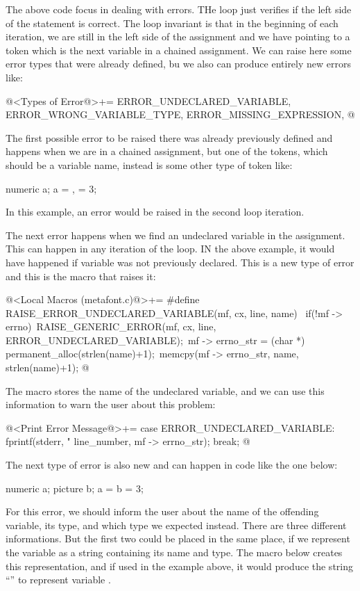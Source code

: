 The above code focus in dealing with errors. THe
loop  just verifies if the left side of the
statement is correct. The loop invariant is that in the beginning of
each iteration, we are still in the left side of the assignment and we
have  pointing to a token which is the next variable
in a chained assignment. We can raise here some error types that were
already defined, bu we also can produce entirely new errors like:

\iniciocodigo
@<Types of Error@>+=
ERROR_UNDECLARED_VARIABLE, ERROR_WRONG_VARIABLE_TYPE, ERROR_MISSING_EXPRESSION,
@
\fimcodigo

The first possible error to be raised there was already previously
defined and happens when we are in a chained assignment, but one of
the tokens, which should be a variable name, instead is some other
type of token like:

\alinhaverbatim
numeric a;
a = , = 3; %
\alinhanormal

In this example, an error would be raised in the second loop iteration.

The next error happens when we find an undeclared variable in the
assignment. This can happen in any iteration of the loop. IN the above
example, it would have happened if variable  was not
previously declared. This is a new type of error and this is the macro
that raises it:

\iniciocodigo
@<Local Macros (metafont.c)@>+=
#define RAISE_ERROR_UNDECLARED_VARIABLE(mf, cx, line, name) {\
  if(!mf -> errno){\
    RAISE_GENERIC_ERROR(mf, cx, line, ERROR_UNDECLARED_VARIABLE);\
    mf -> errno_str = (char *) permanent_alloc(strlen(name)+1);\
    memcpy(mf -> errno_str, name, strlen(name)+1);}}
@
\fimcodigo

The macro stores the name of the undeclared variable, and we can use
this information to warn the user about this problem:

\iniciocodigo
@<Print Error Message@>+=
case ERROR_UNDECLARED_VARIABLE:
  fprintf(stderr, "%
          line_number, mf -> errno_str);
  break;
@
\fimcodigo

The next type of error is also new and can happen in code like the one
below:

\alinhaverbatim
numeric a;
picture b;
a = b = 3; %
\alinhanormal

For this error, we should inform the user about the name of the
offending variable, its type, and which type we expected
instead. There are three different informations. But the first two
could be placed in the same place, if we represent the variable as a
string containing its name and type. The macro below creates this
representation, and if used in the example above, it would produce the
string ``\monoespaco{<b:picture>}'' to represent
variable \monoespaco{b}.

